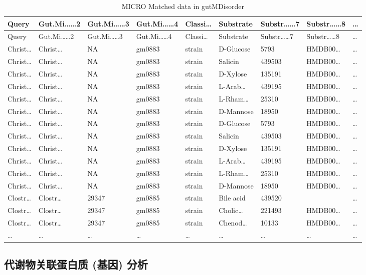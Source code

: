 \documentclass[
]{article}
\begin{document}
\begin{longtable}[]{@{}lllllllll@{}}
\caption{\label{tab:MICRO-Matched-data-in-gutMDisorder}MICRO Matched data in gutMDisorder}\tabularnewline
\toprule
Query & Gut.Mi\ldots\ldots2 & Gut.Mi\ldots\ldots3 & Gut.Mi\ldots\ldots4 & Classi\ldots{} & Substrate & Substr\ldots\ldots7 & Substr\ldots\ldots8 & \ldots{}\tabularnewline
\midrule
\endfirsthead
\toprule
Query & Gut.Mi\ldots\ldots2 & Gut.Mi\ldots\ldots3 & Gut.Mi\ldots\ldots4 & Classi\ldots{} & Substrate & Substr\ldots\ldots7 & Substr\ldots\ldots8 & \ldots{}\tabularnewline
\midrule
\endhead
Christ\ldots{} & Christ\ldots{} & NA & gm0883 & strain & D-Glucose & 5793 & HMDB00\ldots{} & \ldots{}\tabularnewline
Christ\ldots{} & Christ\ldots{} & NA & gm0883 & strain & Salicin & 439503 & HMDB00\ldots{} & \ldots{}\tabularnewline
Christ\ldots{} & Christ\ldots{} & NA & gm0883 & strain & D-Xylose & 135191 & HMDB00\ldots{} & \ldots{}\tabularnewline
Christ\ldots{} & Christ\ldots{} & NA & gm0883 & strain & L-Arab\ldots{} & 439195 & HMDB00\ldots{} & \ldots{}\tabularnewline
Christ\ldots{} & Christ\ldots{} & NA & gm0883 & strain & L-Rham\ldots{} & 25310 & HMDB00\ldots{} & \ldots{}\tabularnewline
Christ\ldots{} & Christ\ldots{} & NA & gm0883 & strain & D-Mannose & 18950 & HMDB00\ldots{} & \ldots{}\tabularnewline
Christ\ldots{} & Christ\ldots{} & NA & gm0883 & strain & D-Glucose & 5793 & HMDB00\ldots{} & \ldots{}\tabularnewline
Christ\ldots{} & Christ\ldots{} & NA & gm0883 & strain & Salicin & 439503 & HMDB00\ldots{} & \ldots{}\tabularnewline
Christ\ldots{} & Christ\ldots{} & NA & gm0883 & strain & D-Xylose & 135191 & HMDB00\ldots{} & \ldots{}\tabularnewline
Christ\ldots{} & Christ\ldots{} & NA & gm0883 & strain & L-Arab\ldots{} & 439195 & HMDB00\ldots{} & \ldots{}\tabularnewline
Christ\ldots{} & Christ\ldots{} & NA & gm0883 & strain & L-Rham\ldots{} & 25310 & HMDB00\ldots{} & \ldots{}\tabularnewline
Christ\ldots{} & Christ\ldots{} & NA & gm0883 & strain & D-Mannose & 18950 & HMDB00\ldots{} & \ldots{}\tabularnewline
Clostr\ldots{} & Clostr\ldots{} & 29347 & gm0885 & strain & Bile acid & 439520 & & \ldots{}\tabularnewline
Clostr\ldots{} & Clostr\ldots{} & 29347 & gm0885 & strain & Cholic\ldots{} & 221493 & HMDB00\ldots{} & \ldots{}\tabularnewline
Clostr\ldots{} & Clostr\ldots{} & 29347 & gm0885 & strain & Chenod\ldots{} & 10133 & HMDB00\ldots{} & \ldots{}\tabularnewline
\ldots{} & \ldots{} & \ldots{} & \ldots{} & \ldots{} & \ldots{} & \ldots{} & \ldots{} & \ldots{}\tabularnewline
\bottomrule
\end{longtable}

\hypertarget{ux4ee3ux8c22ux7269ux5173ux8054ux86cbux767dux8d28-ux57faux56e0-ux5206ux6790}{%
\subsection{代谢物关联蛋白质 (基因) 分析}\label{ux4ee3ux8c22ux7269ux5173ux8054ux86cbux767dux8d28-ux57faux56e0-ux5206ux6790}}
\end{document}
